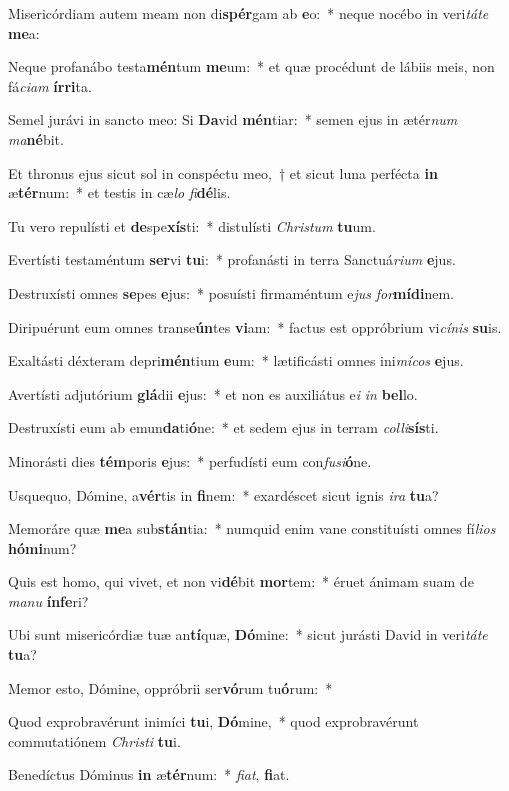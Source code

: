 \item Misericórdiam autem meam non di\textbf{spér}gam ab \textbf{e}o:~* neque nocébo in veri\textit{tá}\textit{te} \textbf{me}a:
\item Neque profanábo testa\textbf{mén}tum \textbf{me}um:~* et quæ procédunt de lábiis meis, non fá\textit{ci}\textit{am} \textbf{ír}\textbf{ri}ta.
\item Semel jurávi in sancto meo: Si \textbf{Da}vid \textbf{mén}tiar:~* semen ejus in ætér\textit{num} \textit{ma}\textbf{né}bit.
\item Et thronus ejus sicut sol in conspéctu meo,~† et sicut luna perfécta \textbf{in} æ\textbf{tér}num:~* et testis in cæ\textit{lo} \textit{fi}\textbf{dé}lis.
\item Tu vero repulísti et \textbf{de}spe\textbf{xís}ti:~* distulísti \textit{Chris}\textit{tum} \textbf{tu}um.
\item Evertísti testaméntum \textbf{ser}vi \textbf{tu}i:~* profanásti in terra Sanctuá\textit{ri}\textit{um} \textbf{e}jus.
\item Destruxísti omnes \textbf{se}pes \textbf{e}jus:~* posuísti firmaméntum e\textit{jus} \textit{for}\textbf{mí}\textbf{di}nem.
\item Diripuérunt eum omnes transe\textbf{ún}tes \textbf{vi}am:~* factus est oppróbrium vi\textit{cí}\textit{nis} \textbf{su}is.
\item Exaltásti déxteram depri\textbf{mén}tium \textbf{e}um:~* lætificásti omnes ini\textit{mí}\textit{cos} \textbf{e}jus.
\item Avertísti adjutórium \textbf{glá}dii \textbf{e}jus:~* et non es auxiliátus e\textit{i} \textit{in} \textbf{bel}lo.
\item Destruxísti eum ab emun\textbf{da}ti\textbf{ó}ne:~* et sedem ejus in terram \textit{col}\textit{li}\textbf{sís}ti.
\item Minorásti dies \textbf{tém}poris \textbf{e}jus:~* perfudísti eum con\textit{fu}\textit{si}\textbf{ó}ne.
\item Usquequo, Dómine, a\textbf{vér}tis in \textbf{fi}nem:~* exardéscet sicut ignis \textit{i}\textit{ra} \textbf{tu}a?
\item Memoráre quæ \textbf{me}a sub\textbf{stán}tia:~* numquid enim vane constituísti omnes fí\textit{li}\textit{os} \textbf{hó}\textbf{mi}num?
\item Quis est homo, qui vivet, et non vi\textbf{dé}bit \textbf{mor}tem:~* éruet ánimam suam de \textit{ma}\textit{nu} \textbf{ín}\textbf{fe}ri?
\item Ubi sunt misericórdiæ tuæ an\textbf{tí}quæ, \textbf{Dó}mine:~* sicut jurásti David in veri\textit{tá}\textit{te} \textbf{tu}a?
\item Memor esto, Dómine, oppróbrii ser\textbf{vó}rum tu\textbf{ó}rum:~* 
\item Quod exprobravérunt inimíci \textbf{tu}i, \textbf{Dó}mine,~* quod exprobravérunt commutatiónem \textit{Chris}\textit{ti} \textbf{tu}i.
\item Benedíctus Dóminus \textbf{in} æ\textbf{tér}num:~* \textit{fi}\textit{at}, \textbf{fi}at.
